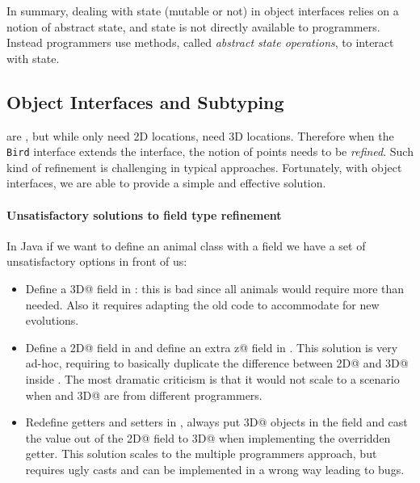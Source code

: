 In summary, dealing with state (mutable or not) in object interfaces
relies on a notion of abstract state, and state is not directly
available to programmers. Instead programmers use methods, called
\emph{abstract state operations}, to interact with state.


\subsection{Object Interfaces and Subtyping}
\Q@Bird@s are \Q@Animal@s, but while \Q@Animal@s only need 2D
locations, \Q@Bird@s need 3D locations. Therefore when the \texttt{Bird}
interface extends the \Q@Animal@ interface, the notion of points needs to
be \emph{refined}. Such kind of refinement is challenging
in typical \classbased approaches. Fortunately, with object interfaces,
we are able to provide a simple and effective solution.

\paragraph{Unsatisfactory \classbased solutions to field type refinement}
In Java if we want to define an animal class with a field we have a set of
unsatisfactory options in front of us:
\begin{itemize}
\item Define a \Q@Point3D@ field in \Q@Animal@: this is bad since all animals
  would require more than needed.
  Also it requires adapting the old code to accommodate for new evolutions.

\item Define a \Q@Point2D@ field in \Q@Animal@ and define an extra \Q@int z@
  field in \Q@Bird@.  This solution is very ad-hoc, requiring to basically
  duplicate the difference between \Q@Point2D@ and \Q@Point3D@ inside \Q@Bird@.
  The most dramatic criticism is that it would not scale to a scenario when
  \Q@Bird@ and \Q@Point3D@ are from different programmers.

\item Redefine getters and setters in \Q@Bird@, always put \Q@Point3D@ objects
  in the field and cast the value out of the \Q@Point2D@ field to \Q@Point3D@
  when implementing the overridden getter.  This solution scales to the multiple
  programmers approach, but requires ugly casts and can be implemented in a
  wrong way leading to bugs.
\end{itemize}

